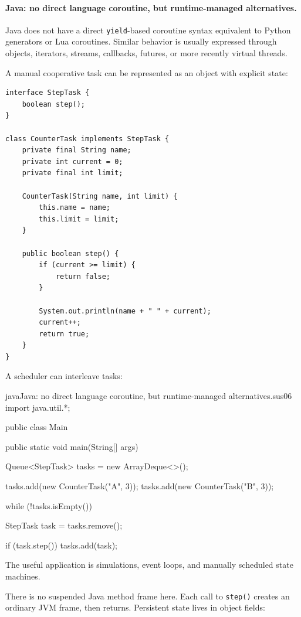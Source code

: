 \paragraph{Java: no direct language coroutine, but runtime-managed alternatives.}

Java does not have a direct \texttt{yield}-based coroutine syntax equivalent to Python generators or Lua coroutines. Similar behavior is usually expressed through objects, iterators, streams, callbacks, futures, or more recently virtual threads.

A manual cooperative task can be represented as an object with explicit state:

\begin{verbatim}
interface StepTask {
    boolean step();
}

class CounterTask implements StepTask {
    private final String name;
    private int current = 0;
    private final int limit;

    CounterTask(String name, int limit) {
        this.name = name;
        this.limit = limit;
    }

    public boolean step() {
        if (current >= limit) {
            return false;
        }

        System.out.println(name + " " + current);
        current++;
        return true;
    }
}
\end{verbatim}

A scheduler can interleave tasks:

\begin{codebox}[]{java}{Java: no direct language coroutine, but runtime-managed alternatives.}{sus06}
import java.util.*;

public class Main {
    public static void main(String[] args) {
        Queue<StepTask> tasks = new ArrayDeque<>();

        tasks.add(new CounterTask("A", 3));
        tasks.add(new CounterTask("B", 3));

        while (!tasks.isEmpty()) {
            StepTask task = tasks.remove();

            if (task.step()) {
                tasks.add(task);
            }
        }
    }
}
\end{codebox}


The useful application is simulations, event loops, and manually scheduled state machines.

There is no suspended Java method frame here. Each call to \texttt{step()} creates an ordinary JVM frame, then returns. Persistent state lives in object fields:

